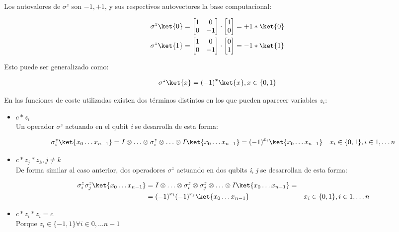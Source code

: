 Los autovalores de $\sigma^z$ son $-1, +1$, y sus respectivos autovectores la base computacional:

\begin{align*}
  \sigma^z\ket{0} = \begin{bmatrix} 1 & 0 \\ 0 & -1 \end{bmatrix} \cdot \begin{bmatrix} 1 \\ 0 \end{bmatrix} = +1*\ket{0} \\
  \sigma^z\ket{1} = \begin{bmatrix} 1 & 0 \\ 0 & -1 \end{bmatrix} \cdot \begin{bmatrix} 0 \\ 1 \end{bmatrix} = -1*\ket{1}
\end{align*}

Esto puede ser generalizado como:

\begin{align*}
  \sigma^z\ket{x} = {(-1)}^x\ket{x}, x \in \{0, 1\}
\end{align*}

En las funciones de coste utilizadas existen dos términos distintos en los que pueden aparecer variables $z_i$:
\begin{itemize}
\item $c*z_i$ \\
  Un operador $\sigma^z$ actuando en el qubit \textit{i} se desarrolla de esta forma:

  \begin{align}\label{eq:8-demostracion-z_i}
    &\sigma^z_i \ket{x_0 \ldots x_{n-1}} = I \otimes \ldots \otimes \sigma^z_i \otimes \ldots \otimes I \ket{x_0 \ldots x_{n-1}} = {(-1)}^{x_i} \ket{x_0 \ldots x_{n-1}}     & x_i \in \{0, 1\}, i \in 1, \ldots n
  \end{align}
  
\item $c*z_j*z_k, j \ne k$ \\
  De forma similar al caso anterior, dos operadores $\sigma^z$ actuando en dos qubits \textit{i}, \textit{j} se desarrollan de esta forma:

  \begin{align}\label{eq:8-demostracion-z_i_j}
    \sigma^z_i \sigma^z_j \ket{x_0 \ldots x_{n-1}} &= I \otimes \ldots \otimes \sigma^z_i \otimes \sigma^z_j \otimes \ldots \otimes I \ket{x_0 \ldots x_{n-1}} = \nonumber \\
                                    &= {(-1)}^{x_i} {(-1)}^{x_j} \ket{x_0 \ldots x_{n-1}}     & x_i \in \{0, 1\}, i \in 1, \ldots n
  \end{align}

\item $c*z_i*z_i = c$ \\
  Porque $z_i \in \{-1, 1\} \forall i \in 0, \ldots n - 1$

\end{itemize}

